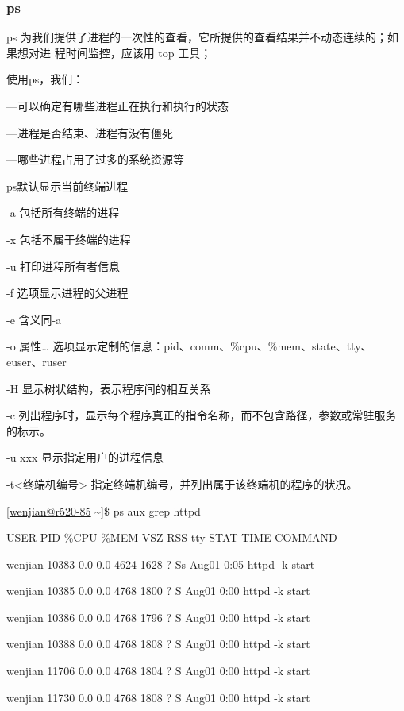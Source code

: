 \documentclass[letterpaper,10pt]{sphinxmanual}
\begin{document}
\subsubsection{ps}
\label{Linux_pro_mana/tools:ps}
ps 为我们提供了进程的一次性的查看，它所提供的查看结果并不动态连续的；如果想对进
程时间监控，应该用 top 工具；

使用ps，我们：

—可以确定有哪些进程正在执行和执行的状态

—进程是否结束、进程有没有僵死

—哪些进程占用了过多的系统资源等

ps默认显示当前终端进程

-a 包括所有终端的进程

-x 包括不属于终端的进程

-u 打印进程所有者信息

-f 选项显示进程的父进程

-e 含义同-a

-o 属性… 选项显示定制的信息：pid、comm、\%cpu、\%mem、state、tty、euser、ruser

-H 显示树状结构，表示程序间的相互关系

-c 列出程序时，显示每个程序真正的指令名称，而不包含路径，参数或常驻服务的标示。

-u xxx 显示指定用户的进程信息
\begin{optionlist}{3cm}
\item [-t\textless{}终端机编号\textgreater{}]  
指定终端机编号，并列出属于该终端机的程序的状况。
\end{optionlist}

{[}\href{mailto:wenjian@r520-85}{wenjian@r520-85} \textasciitilde{}{]}\$ ps aux {\color{red}\bfseries{}\textbar{}}grep httpd

USER     PID    \%CPU \%MEM  VSZ   RSS  tty     STAT  TIME         COMMAND

wenjian  10383  0.0  0.0   4624  1628 ?        Ss   Aug01   0:05 httpd -k start

wenjian  10385  0.0  0.0   4768  1800 ?        S    Aug01   0:00 httpd -k start

wenjian  10386  0.0  0.0   4768  1796 ?        S    Aug01   0:00 httpd -k start

wenjian  10388  0.0  0.0   4768  1808 ?        S    Aug01   0:00 httpd -k start

wenjian  11706  0.0  0.0   4768  1804 ?        S    Aug01   0:00 httpd -k start

wenjian  11730  0.0  0.0   4768  1808 ?        S    Aug01   0:00 httpd -k start
\end{document}
